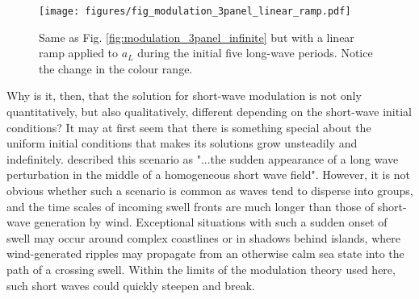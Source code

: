 \documentclass[lineno]{jfm}
\begin{document}
\begin{figure}
\centering
\texttt{[image: figures/fig\_modulation\_3panel\_linear\_ramp.pdf]}
\caption{
  Same as Fig. \ref{fig:modulation_3panel_infinite} but with a linear ramp
  applied to $a_L$ during the initial five long-wave periods.
  Notice the change in the colour range.
}
\label{fig:modulation_3panel_ramp}
\end{figure}

Why is it, then, that the solution for short-wave modulation is not only
quantitatively, but also qualitatively, different depending on the short-wave
initial conditions?
It may at first seem that there is something special about the uniform initial
conditions that makes its solutions grow unsteadily and indefinitely.
\citet{peureux2021unsteady} described this scenario as "...the sudden appearance
of a long wave perturbation in the middle of a homogeneous short wave field".
However, it is not obvious whether such a scenario is common as waves tend to
disperse into groups, and the time scales of incoming swell fronts are much
longer than those of short-wave generation by wind.
Exceptional situations with such a sudden onset of swell may occur
around complex coastlines or in shadows behind islands, where wind-generated
ripples may propagate from an otherwise calm sea state into the path of a
crossing swell.
Within the limits of the modulation theory used here, such short waves could
quickly steepen and break.
\end{document}
